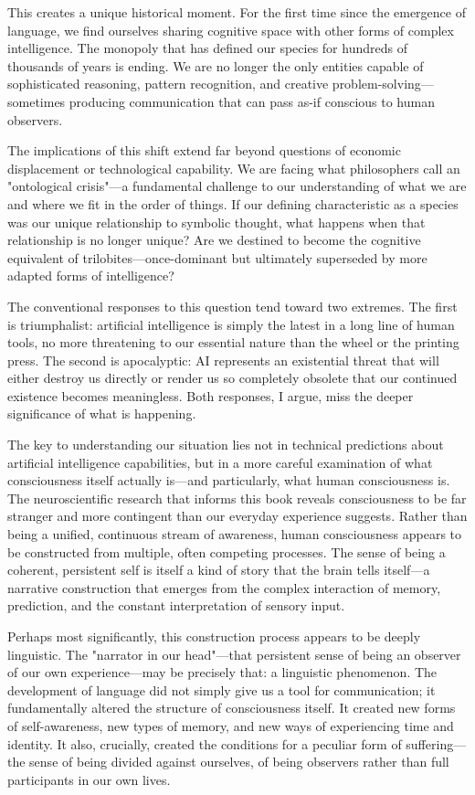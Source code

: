 \documentclass[12pt,letterpaper]{book}
\begin{document}
This creates a unique historical moment. For the first time since the emergence of language, we find ourselves sharing cognitive space with other forms of complex intelligence. The monopoly that has defined our species for hundreds of thousands of years is ending. We are no longer the only entities capable of sophisticated reasoning, pattern recognition, and creative problem-solving—sometimes producing communication that can pass as-if conscious to human observers.

The implications of this shift extend far beyond questions of economic displacement or technological capability. We are facing what philosophers call an "ontological crisis"—a fundamental challenge to our understanding of what we are and where we fit in the order of things. If our defining characteristic as a species was our unique relationship to symbolic thought, what happens when that relationship is no longer unique? Are we destined to become the cognitive equivalent of trilobites—once-dominant but ultimately superseded by more adapted forms of intelligence?

The conventional responses to this question tend toward two extremes. The first is triumphalist: artificial intelligence is simply the latest in a long line of human tools, no more threatening to our essential nature than the wheel or the printing press. The second is apocalyptic: AI represents an existential threat that will either destroy us directly or render us so completely obsolete that our continued existence becomes meaningless. Both responses, I argue, miss the deeper significance of what is happening.

The key to understanding our situation lies not in technical predictions about artificial intelligence capabilities, but in a more careful examination of what consciousness itself actually is—and particularly, what human consciousness is. The neuroscientific research that informs this book reveals consciousness to be far stranger and more contingent than our everyday experience suggests. Rather than being a unified, continuous stream of awareness, human consciousness appears to be constructed from multiple, often competing processes. The sense of being a coherent, persistent self is itself a kind of story that the brain tells itself—a narrative construction that emerges from the complex interaction of memory, prediction, and the constant interpretation of sensory input.

Perhaps most significantly, this construction process appears to be deeply linguistic. The "narrator in our head"—that persistent sense of being an observer of our own experience—may be precisely that: a linguistic phenomenon. The development of language did not simply give us a tool for communication; it fundamentally altered the structure of consciousness itself. It created new forms of self-awareness, new types of memory, and new ways of experiencing time and identity. It also, crucially, created the conditions for a peculiar form of suffering—the sense of being divided against ourselves, of being observers rather than full participants in our own lives.
\end{document}
